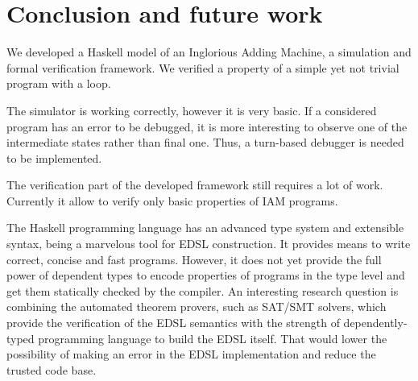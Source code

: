 \section{Conclusion and future work}

We developed a Haskell model of an Inglorious Adding Machine, a simulation and formal verification framework.
We verified a property of a simple yet not trivial program with a loop.

The simulator is working correctly, however it is very basic. If a considered program has an error to be
debugged, it is more interesting to observe one of the intermediate states rather than final one.
Thus, a turn-based debugger is needed to be implemented.

The verification part of the developed framework still requires a lot of work. Currently it allow to verify
only basic properties of IAM programs.

The Haskell programming language has an advanced type system and extensible syntax, being a marvelous tool for
EDSL construction. It provides means to write correct, concise and fast programs. However, it does not yet
provide the full power of dependent types to encode properties of programs in the type level and get them
statically checked by the compiler. An interesting research question is combining the automated theorem
provers, such as SAT/SMT solvers, which provide the verification of the EDSL semantics with the strength of
dependently-typed programming language to build the EDSL itself. That would lower the possibility of making an
error in the EDSL implementation and reduce the trusted code base.